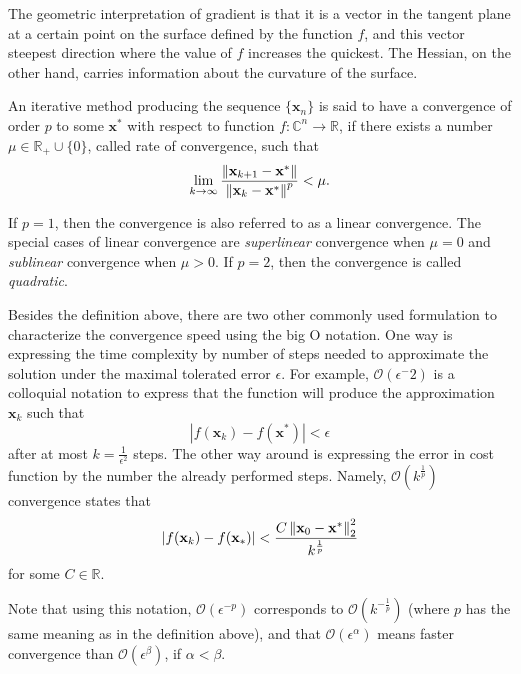 \begin{tight_equations}
\begin{remark}
The geometric interpretation of gradient is that it is a vector in the tangent plane at a certain point on the surface defined by the function $f$, and this vector steepest direction where the value of $f$ increases the quickest. The Hessian, on the other hand, carries information about the curvature of the surface.
\end{remark}

\begin{definition}
An iterative method producing the sequence $\{\mathbf{x}_n\}$ is said to have a convergence of order $p$ to some $\mathbf{x}^*$ with respect to function $f:\mathbb{C}^n \rightarrow \mathbb{R}$, if there exists a number $\mu \in \mathbb{R}_+  \cup \{0\}$, called rate of convergence, such that
\[\lim_{k \rightarrow \infty} \frac{\left\lVert\mathbf{x}_{k+1} - \mathbf{x}^*\right\rVert}{\left\lVert\mathbf{x}_{k} - \mathbf{x}^*\right\rVert^p} < \mu.\]
\end{definition}

\begin{remark}
If $p = 1$, then the convergence is also referred to as a linear convergence. The special cases of linear convergence are \textit{superlinear} convergence when $\mu = 0$ and \textit{sublinear} convergence when $\mu > 0$. If $p=2$, then the convergence is called \textit{quadratic}.
\end{remark}

\begin{notation}
Besides the definition above, there are two other commonly used formulation to characterize the convergence speed using the big O notation. One way is expressing the time complexity by number of steps needed to approximate the solution under the maximal tolerated error $\epsilon$. For example, $ \mathcal{O}(\epsilon^-2)$ is a colloquial notation to express that the function will produce the approximation $\mathbf{x}_k$ such that 
\[|f(\mathbf{x}_{k}) - f(\mathbf{x}^*)| < \epsilon\]
after at most $k = \frac{1}{\epsilon^2}$ steps. The other way around is expressing the error in cost function by the number the already performed steps. Namely, $\mathcal{O}(k^\frac{1}{p})$ convergence states that
\[|f(\mathbf{x}_k) - f(\mathbf{x}_*)| < \frac{C\left\lVert\mathbf{x}_{0} - \mathbf{x}^*\right\rVert_2^2}{k^\frac{1}{p}}\]
for some $C \in \mathbb{R}$.
\end{notation}

\begin{remark}
Note that using this notation, $\mathcal{O}(\epsilon^{-p})$ corresponds to $\mathcal{O}(k^{-\frac{1}{p}})$ (where $p$ has the same meaning as in the definition above), and that $\mathcal{O}(\epsilon^\alpha)$ means faster convergence than $\mathcal{O}(\epsilon^\beta)$, if $\alpha < \beta$.
\end{remark}


\end{tight_equations}
